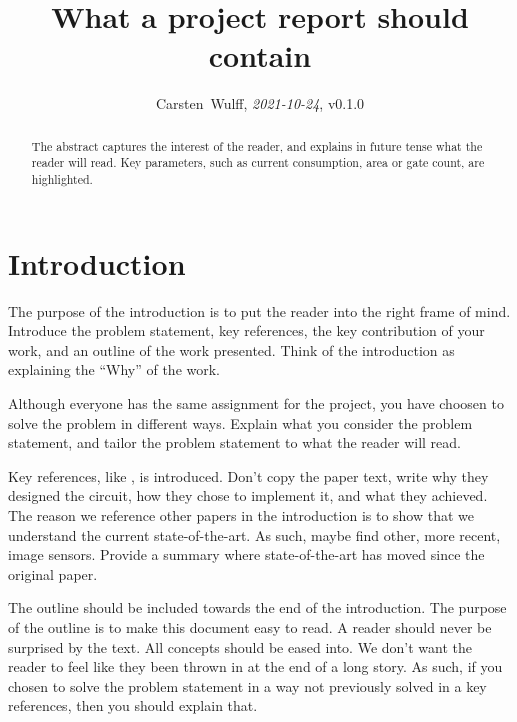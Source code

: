 \documentclass[paper,10pt,a4paper]{IEEEtran}
\begin{document}

\title{What a project report should contain}
\author{Carsten~Wulff, \textit{2021-10-24}, v0.1.0 }
\maketitle

\begin{abstract}
  The abstract captures the interest of the reader, and explains in future tense
  what the reader will read. Key parameters, such as current consumption, area
  or gate count, are highlighted.
\end{abstract}

\section{Introduction}

The purpose of the introduction is to put the reader into the right frame of
mind. Introduce the problem statement, key references, the key contribution of
your work, and an outline of the
work presented. Think of the introduction
as explaining the ``Why'' of the work.

Although everyone has the same assignment for the project, you have choosen to
solve the problem in different ways. Explain what you consider the problem
statement, and tailor the problem statement to what the reader will read.

Key references, like \cite{klein01}, is introduced. Don't copy the paper text, write why they designed the circuit, how they chose to implement it, and
what they achieved. The reason we reference other papers in the introduction is
to show that we understand the current state-of-the-art. As such, maybe find
other, more recent, image sensors. Provide a summary where
state-of-the-art has moved since the original paper.

The outline should be included towards the end of the
introduction. The purpose of the outline is to make this document easy to read. A reader should
never be surprised by the text. All concepts should be eased into. We don't want
the reader to feel like they been thrown in at the end of a long story. As such,
if you chosen to solve the problem statement in a way not previously solved in a
key references, then you should explain that.
\end{document}
